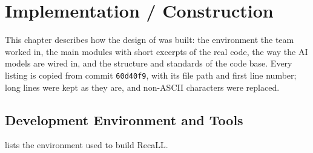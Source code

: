 \chapter{Implementation / Construction}\label{ch:impl}

This chapter describes how the design of  was built: the
environment the team worked in, the main modules with short excerpts of the real code,
the way the AI models are wired in, and the structure and standards of the code base.
Every listing is copied from commit \texttt{60d40f9}, with its file path and first line
number; long lines were kept as they are, and non-ASCII characters were replaced.

\section{Development Environment and Tools}\label{sec:devenv}

 lists the environment used to build RecaLL.

